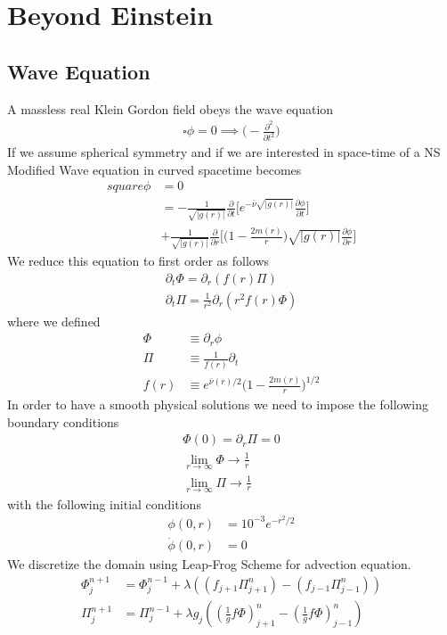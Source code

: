 \documentclass[aps,twocolumn,showpacs,preprintnumbers,nofootinbib,prl,superscriptaddress,groupedaddress]{revtex4-1}
\begin{document}
\section{Beyond Einstein}

\subsection{Wave Equation}
A massless real Klein Gordon field obeys the wave equation
\begin{align}
	\square\phi = 0 \implies \bigg(-\frac{\partial^2}{\partial t^2}\bigg)
\end{align}
If we assume spherical symmetry and if we are interested in space-time of a NS Modified Wave equation in curved spacetime becomes
\begin{align}
	square\phi &= 0\nonumber\\
	&= -\frac{1}{\sqrt{|g(r)|}} \frac{\partial}{\partial t} \bigg[
	e^{-\bar{\nu}\sqrt{|g(r)|}} \frac{\partial \phi}{\partial t}
	\bigg]\nonumber\\
	&+ \frac{1}{\sqrt{|g(r)|}} \frac{\partial}{\partial r} \bigg[\bigg(1 - \frac{2m(r)}{r}\bigg)\sqrt{|g(r)|} \frac{\partial \phi}{\partial r}\bigg]
\end{align}
We reduce this equation to first order as follows
\begin{align}
	\partial_t \Phi = \partial_r (f(r) \Pi)\\
	\partial_t \Pi = \frac{1}{r^2}\partial_r(r^2f(r)\Phi)
\end{align}
where we defined 
\begin{align}
	\Phi &\equiv \partial_r\phi\\
	\Pi &\equiv  \frac{1}{f(r)}\partial_t\nonumber\\
	f(r) &\equiv e^{\bar{\nu}(r)/2} \bigg(1 - \frac{2m(r)}{r}\bigg)^{1/2}\nonumber
\end{align}
In order to have a smooth physical solutions we need to impose the following boundary conditions
\begin{align}
	\Phi(0) = \partial_r\Pi = 0\\
	\lim\limits_{r \rightarrow \infty }\Phi \rightarrow \frac{1}{r}\\
	\lim\limits_{r \rightarrow \infty }\Pi \rightarrow \frac{1}{r}
\end{align}
with the following initial conditions
\begin{align}
	\phi(0,r) &= 10^{-3}e^{-r^2/2}\\
	\dot{\phi}(0,r) &= 0 
\end{align}
We discretize the domain using Leap-Frog Scheme for advection equation.
\begin{align}
	\Phi_j^{n+1} &= \Phi_j^{n-1} + \lambda ((f_{j+1}\Pi_{j+1}^n ) - (f_{j-1}\Pi_{j-1}^n ))\\
	\Pi_{j}^{n+1} &= \Pi_j^{n-1} + \lambda g_j((\frac{1}{g}f\Phi)^n_{j+1} - (\frac{1}{g}f\Phi)^n_{j-1})\label{leapfrog}
\end{align}
\end{document}
